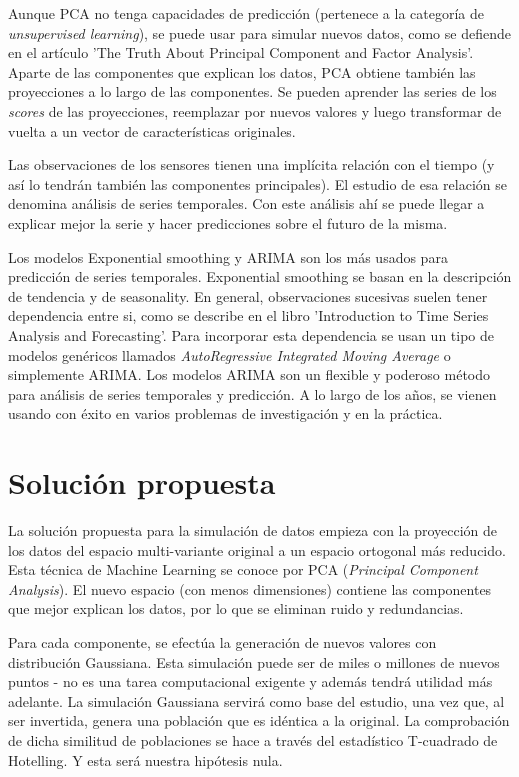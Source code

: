 \documentclass[11pt,spanish,listoffigures,listoftables]{tfgetsinf}
\begin{document}
Aunque PCA no tenga capacidades de predicción (pertenece a la categoría de {\em unsupervised learning}), se puede usar para simular nuevos datos, como se defiende en el artículo 'The Truth About Principal Component and Factor Analysis'. Aparte de las componentes que explican los datos, PCA obtiene también las proyecciones a lo largo de las componentes. Se pueden aprender las series de los {\em scores} de las proyecciones, reemplazar por nuevos valores y luego transformar de vuelta a un vector de características originales.

Las observaciones de los sensores tienen una implícita relación con el tiempo (y así lo tendrán también las componentes principales). El estudio de esa relación se denomina análisis de series temporales. Con este análisis ahí se puede llegar a explicar mejor la serie y hacer predicciones sobre el futuro de la misma. 

Los modelos Exponential smoothing y ARIMA son los más usados para predicción de series temporales. Exponential smoothing se basan en la descripción de tendencia y de seasonality.
En general, observaciones sucesivas suelen tener dependencia entre si, como se describe en el libro 'Introduction to Time Series Analysis and Forecasting'. Para incorporar esta dependencia se usan un tipo de modelos genéricos llamados {\em AutoRegressive Integrated Moving Average} o simplemente ARIMA. Los modelos ARIMA son un flexible y poderoso método para análisis de series temporales y predicción. A lo largo de los años, se vienen usando con éxito en varios problemas de investigación y en la práctica.

\chapter{Solución propuesta}
La solución propuesta para la simulación de datos empieza con la proyección de los datos del espacio multi-variante original a un espacio ortogonal más reducido. Esta técnica de Machine Learning se conoce por PCA ({\em Principal Component Analysis}). El nuevo espacio (con menos dimensiones) contiene las componentes que mejor explican los datos, por lo que se eliminan ruido y redundancias. 

Para cada componente, se efectúa la generación de nuevos valores con distribución Gaussiana. Esta simulación puede ser de miles o millones de nuevos puntos - no es una tarea computacional exigente y además tendrá utilidad más adelante. La simulación Gaussiana servirá como base del estudio, una vez que, al ser invertida, genera una población que es idéntica a la original. La comprobación de dicha similitud de poblaciones se hace a través del estadístico T-cuadrado de Hotelling. Y esta será nuestra hipótesis nula.
\end{document}
